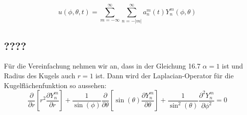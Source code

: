 \begin{equation}
u(\phi,\theta,t) = \sum_{m=-\infty}^{\infty}\sum_{n=-|m|}^{\infty}a_n^m(t)Y_n^m(\phi, \theta)
\label{spektral:equation10}
\end{equation}

\subsection{????
\label{spektral:subsection:???}}

Für die Vereinfachung nehmen wir an, dass in der Gleichung 16.7 $\alpha=1$ ist und Radius des Kugels auch $r=1$ ist.
Dann wird der Laplacian-Operator für die Kugelflächenfunktion so aussehen:
\begin{equation}
 \frac{\partial}{\partial{r}}\left[r^2\frac{\partial{Y_n^m}}{\partial{r}}\right] + \frac{1}{\sin(\phi)}\frac{\partial}{\partial{\theta}}\left[\sin(\theta)\frac{\partial{Y_n^m}}{\partial{\theta}}\right] + \frac{1}{\sin^2(\theta)}\frac{\partial^2{Y_n^m}}{\partial{\phi^2}} = 0
\label{spektral:equation11}
\end{equation}

